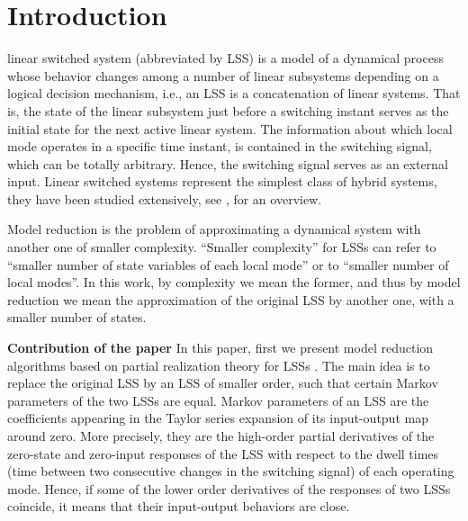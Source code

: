 \documentclass[journal]{IEEEtran}
\begin{document}
\IEEEpeerreviewmaketitle



\section{Introduction}
linear switched system (abbreviated by LSS) is a model of a dynamical process whose behavior changes among a number of linear subsystems depending on a logical decision mechanism, i.e., an LSS is a concatenation of linear systems. That is, the state of the linear subsystem just before a switching instant serves as the initial state for the next active linear system. The information about which local mode operates in a specific time instant, is contained in the switching signal, which can be totally arbitrary. Hence, the switching signal serves as an external input. Linear switched systems represent the simplest class of hybrid systems, they have been studied  extensively,  see \cite{liberzon2003}, \cite{Sun:Book} for an overview.



Model reduction is the problem of approximating a dynamical system with another one of smaller complexity. ``Smaller complexity'' for LSSs can refer to ``smaller number of state variables of each local mode'' or to ``smaller number of local modes''. In this work, by complexity we mean the former, and thus by model reduction we mean the approximation of the original LSS by another one, with a smaller number of states.

\textbf{Contribution of the paper}
In this paper, first we present model reduction algorithms based on partial realization theory for LSSs \cite{petreczky}. 
The main idea is to replace the original LSS by an LSS of smaller order, such that certain Markov parameters of the two LSSs are equal. Markov parameters of an LSS are the coefficients appearing in the Taylor series expansion of its input-output map around zero. More precisely, they are the high-order partial derivatives of the zero-state and zero-input responses of the LSS with respect to the dwell times (time between two consecutive changes in the switching signal) of each operating mode. Hence, if some of the lower order derivatives of the responses of two LSSs coincide, it means that their input-output behaviors are close. 
\end{document}
